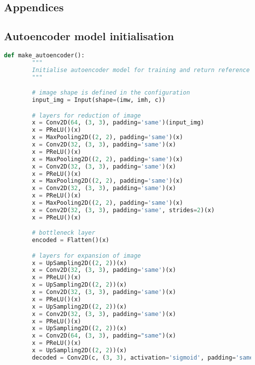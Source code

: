 \documentclass{l4proj}
\begin{document}
\begin{appendices}

\chapter{Appendices}

\section{Autoencoder model initialisation}

\begin{lstlisting}[language=python, float, caption={Keras code for initialising the autoencoder model developed here. It contains 5 downsampling and upsampling operations. It returns both its encoder and decoder parts. The decoder is used to evaluate the performance of the autoencoder at image reconstruction. The encoder is used to encode images to project them onto a two-dimensional plane using t-SNE and UMAP, and is also the building block for our regression model. Started from a tutorial by \citet{chollet_keras}, and was expanded through experiments and research.}, label=lst:autoencoder]
    def make_autoencoder():
        """
        Initialise autoencoder model for training and return reference to both decoder and encoder parts of the model.
        """

        # image shape is defined in the configuration
        input_img = Input(shape=(imw, imh, c))

        # layers for reduction of image
        x = Conv2D(64, (3, 3), padding='same')(input_img)
        x = PReLU()(x)
        x = MaxPooling2D((2, 2), padding='same')(x)
        x = Conv2D(32, (3, 3), padding='same')(x)
        x = PReLU()(x)
        x = MaxPooling2D((2, 2), padding='same')(x)
        x = Conv2D(32, (3, 3), padding='same')(x)
        x = PReLU()(x)
        x = MaxPooling2D((2, 2), padding='same')(x)
        x = Conv2D(32, (3, 3), padding='same')(x)
        x = PReLU()(x)
        x = MaxPooling2D((2, 2), padding='same')(x)
        x = Conv2D(32, (3, 3), padding='same', strides=2)(x)
        x = PReLU()(x)

        # bottleneck layer
        encoded = Flatten()(x)

        # layers for expansion of image
        x = UpSampling2D((2, 2))(x)
        x = Conv2D(32, (3, 3), padding='same')(x)
        x = PReLU()(x)
        x = UpSampling2D((2, 2))(x)
        x = Conv2D(32, (3, 3), padding='same')(x)
        x = PReLU()(x)
        x = UpSampling2D((2, 2))(x)
        x = Conv2D(32, (3, 3), padding='same')(x)
        x = PReLU()(x)
        x = UpSampling2D((2, 2))(x)
        x = Conv2D(64, (3, 3), padding="same")(x)
        x = PReLU()(x)
        x = UpSampling2D((2, 2))(x)
        decoded = Conv2D(c, (3, 3), activation='sigmoid', padding='same')(x)


\end{lstlisting}
\end{appendices}
\end{document}

